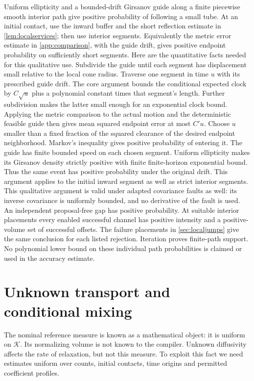 \documentclass[11pt]{article}
\numberwithin{equation}{section}
\theoremstyle{definition}
\theoremstyle{remark}\newtheorem{remark}[theorem]{Remark}
\newcommand{\K}{\mathcal K}
\begin{document}
Uniform ellipticity and a bounded-drift Girsanov guide along a finite
piecewise smooth interior path give positive probability of following a
small tube. At an initial contact, use the inward buffer and the short
reflection estimate in \cref{lem:localservices}; then use interior segments.
Equivalently the metric error estimate in \cref{app:comparison}, with the
guide drift, gives positive endpoint probability on sufficiently short
segments. Here are the quantitative facts needed for this qualitative
use. Subdivide the guide until each segment has displacement small relative
to the local cone radius. Traverse one segment in time $u$ with its
prescribed guide drift. The core argument bounds the conditional expected
clock by $C\sqrt u$ plus a polynomial constant times that segment's
length. Further subdivision makes the latter small enough for an
exponential clock bound. Applying the metric comparison to the actual
motion and the deterministic feasible guide then gives mean squared
endpoint error at most $C'u$. Choose $u$ smaller than a fixed fraction of
the squared clearance of the desired endpoint neighborhood. Markov's
inequality gives positive probability of entering it. The guide has finite
bounded speed on each chosen segment. Uniform ellipticity makes its
Girsanov density strictly positive with finite finite-horizon exponential
bound. Thus the same event has positive probability under the original
drift. This argument applies to the initial inward segment as well as
strict interior segments. This qualitative argument
is valid under adapted covariance faults as well: its inverse covariance is
uniformly bounded, and no derivative of the fault is used.
An independent proposal-free gap has positive probability. At suitable
interior placements every enabled successful channel has positive intensity
and a positive-volume set of successful offsets. The failure placements in
\cref{sec:localjumps} give the same conclusion for each listed rejection.
Iteration proves finite-path support. No polynomial lower bound on these
individual path probabilities is claimed or used in the accuracy estimate.



\section{Unknown transport and conditional mixing}
\label{sec:transport}

The nominal reference measure is known as a mathematical object: it is
uniform on $\K$. Its normalizing volume is not known to the compiler.
Unknown diffusivity affects the rate of relaxation, but not this measure.
To exploit this fact we need estimates uniform over counts, initial contacts,
time origins and permitted coefficient profiles.
\end{document}
